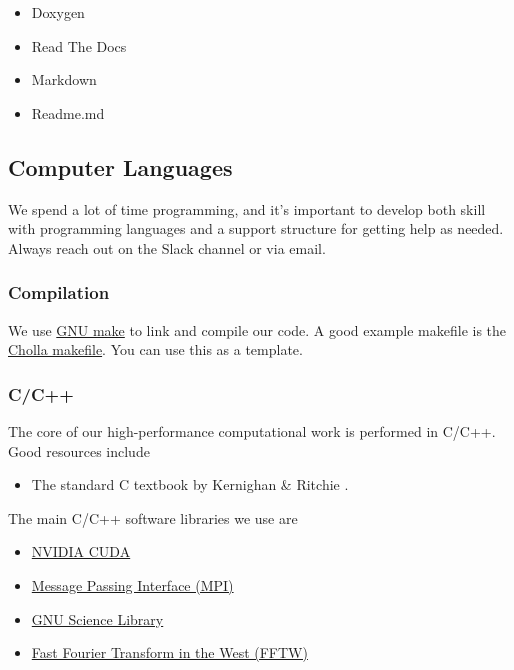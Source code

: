 \begin{itemize}
	\item Doxygen
	\item Read The Docs
	\item Markdown
	\item Readme.md
\end{itemize}


\subsection{Computer Languages}
\label{sec:languages}

We spend a lot of time programming, and it's important to develop both skill with programming languages and a support structure for getting help as needed.  Always reach out on the Slack channel or via email.

\subsubsection{Compilation}
\label{sec:compilation}

We use \href{https://www.gnu.org/software/make/}{GNU make} to link and compile our code.  A good example makefile is the \href{https://raw.githubusercontent.com/cholla-hydro/cholla/master/Makefile}{Cholla makefile}.  You can use this as a template.

\subsubsection{C/C++}
\label{sec:c}

The core of our high-performance computational work is performed in C/C++. Good resources include

\begin{itemize}
	\item The standard C textbook by Kernighan \& Ritchie \cite{kernighan1988a}.
\end{itemize} 

\noindent
The main C/C++ software libraries we use are
\begin{itemize}
	\item \href{https://developer.nvidia.com/cuda-zone}{NVIDIA CUDA}
	\item \href{https://www.open-mpi.org}{Message Passing Interface (MPI)}
	\item \href{https://www.gnu.org/software/gsl/}{GNU Science Library}
	\item \href{http://www.fftw.org/}{Fast Fourier Transform in the West (FFTW)}
\end{itemize}

